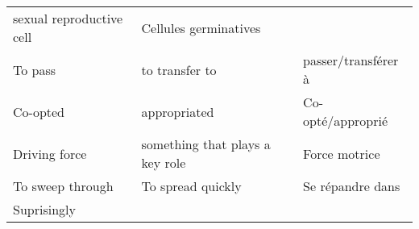 \documentclass[]{article}
\begin{document}
\begin{longtable}[]{@{}lll@{}}
\begin{minipage}[t]{0.18\columnwidth}
sexual reproductive cell\strut
\end{minipage} & \begin{minipage}[t]{0.56\columnwidth}\raggedright
Cellules germinatives\strut
\end{minipage}\tabularnewline
\begin{minipage}[t]{0.18\columnwidth}\raggedright
To pass\strut
\end{minipage} & \begin{minipage}[t]{0.18\columnwidth}\raggedright
to transfer to\strut
\end{minipage} & \begin{minipage}[t]{0.56\columnwidth}\raggedright
passer/transférer à\strut
\end{minipage}\tabularnewline
\begin{minipage}[t]{0.18\columnwidth}\raggedright
Co-opted\strut
\end{minipage} & \begin{minipage}[t]{0.18\columnwidth}\raggedright
appropriated\strut
\end{minipage} & \begin{minipage}[t]{0.56\columnwidth}\raggedright
Co-opté/approprié\strut
\end{minipage}\tabularnewline
\begin{minipage}[t]{0.18\columnwidth}\raggedright
Driving force\strut
\end{minipage} & \begin{minipage}[t]{0.18\columnwidth}\raggedright
something that plays a key role\strut
\end{minipage} & \begin{minipage}[t]{0.56\columnwidth}\raggedright
Force motrice\strut
\end{minipage}\tabularnewline
\begin{minipage}[t]{0.18\columnwidth}\raggedright
To sweep through\strut
\end{minipage} & \begin{minipage}[t]{0.18\columnwidth}\raggedright
To spread quickly\strut
\end{minipage} & \begin{minipage}[t]{0.56\columnwidth}\raggedright
Se répandre dans\strut
\end{minipage}\tabularnewline
\begin{minipage}[t]{0.18\columnwidth}\raggedright
Suprisingly\strut
\end{minipage} & \begin{minipage}[t]{0.18\columnwidth}\raggedright

\end{minipage}
\end{longtable}
\end{document}
